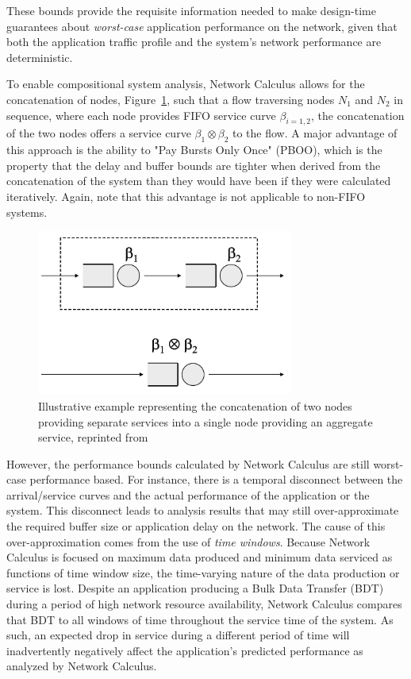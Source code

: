 These bounds provide the requisite information needed to make
design-time guarantees about \emph{worst-case} application performance
on the network, given that both the application traffic profile and
the system's network performance are deterministic.

To enable compositional system analysis, Network Calculus allows for
the concatenation of nodes, Figure~\ref{fig:nc_concatenation}, such
that a flow traversing nodes $N_1$ and $N_2$ in sequence, where each
node provides FIFO service curve $\beta_{i=1,2}$, the concatenation of
the two nodes offers a service curve $\beta_1\otimes\beta_2$ to the
flow.  A major advantage of this approach is the ability to "Pay
Bursts Only Once" (PBOO), which is the property that the delay and
buffer bounds are tighter when derived from the concatenation of the
system than they would have been if they were calculated iteratively.
Again, note that this advantage is not applicable to non-FIFO
systems\cite{NCBook}.

\begin{figure}[htb]
  \centering
  \includegraphics[width=0.75\textwidth]{figs/nc_concatenation.png}
  \caption{Illustrative example representing the concatenation of two
    nodes providing separate services into a single node providing an
    aggregate service, reprinted from \cite{NCBook}}
  \label{fig:nc_concatenation}
\end{figure}

However, the performance bounds calculated by Network Calculus are
still worst-case performance based.  For instance, there is a temporal
disconnect between the arrival/service curves and the actual
performance of the application or the system.  This disconnect leads
to analysis results that may still over-approximate the required
buffer size or application delay on the network.  The cause of this
over-approximation comes from the use of \emph{time windows}.  Because
Network Calculus is focused on maximum data produced and minimum data
serviced as functions of time window size, the time-varying nature of
the data production or service is lost.  Despite an application
producing a Bulk Data Transfer (BDT) during a period of high network
resource availability, Network Calculus compares that BDT to all
windows of time throughout the service time of the system.  As such,
an expected drop in service during a different period of time will
inadvertently negatively affect the application's predicted
performance as analyzed by Network Calculus.

